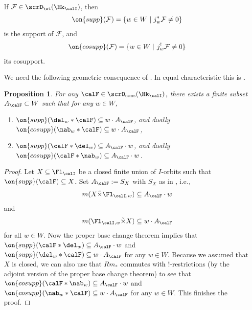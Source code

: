 \documentclass[10pt, reqno]{amsart}
\theoremstyle{plain}
\newtheorem{proposition}[theorem]{Proposition}
\theoremstyle{definition}
\numberwithin{equation}{section}
\begin{document}
	If $\mathcal{F}\in \scrD_\et(\Hk_{\calI})$, then
	\begin{equation}
		\on{supp}(\mathcal{F})=\{w\in W\ |\ j^\ast_w\mathcal{F}\neq 0\}
	\end{equation}
	is the support of $\mathcal{F}$, and
	\begin{equation}
		\on{cosupp}(\mathcal{F})=\{w\in W\ |\ j^!_w\mathcal{F}\neq 0\}
	\end{equation}
	its cosupport.
	
	We need the following geometric consequence of  . In equal characteristic this is \cite[Proposition 4.4.4.]{AR}.
	
	\begin{proposition} \label{prop_support_conv_standard}
		For any $\calF\in \scrD_{\mathrm{cons}}(\Hk_\calI)$, there exists a finite subset $A_\calF\subset W$ such that for any $w\in W$,
		\begin{enumerate}
			\item $ \on{supp}(\del_w*\calF) \subseteq w\cdot A_{\calF}$, and dually $\on{cosupp}(\nab_w*\calF)\subseteq w\cdot A_{\calF}$,
			\item $ \on{supp}(\calF*\del_w)\subseteq A_{\calF}\cdot w$, and dually $\on{cosupp}(\calF\ast \nab_w)\subseteq A_\calF\cdot w$.
		\end{enumerate}
	\end{proposition}
	\begin{proof}
		Let $X\subseteq \Fl_{\calI}$ be a closed finite union of $I$-orbits such that $\on{supp}(\calF)\subseteq X$. Set $A_\calF:=S_X$ with $S_X$ as in , i.e.,
		\begin{equation}
			m(X\tilde{\times} \Fl_{\calI, w})\subseteq A_\calF\cdot w
		\end{equation}
		and
		\begin{equation}
			m(\Fl_{\calI, w}\tilde{\times} X)\subseteq w\cdot A_\calF
		\end{equation}
		for all $w\in W$. Now the proper base change theorem implies that $\on{supp}(\calF\ast \del_w)\subseteq A_\calF\cdot w$ and $\on{supp}(\del_w\ast \calF)\subseteq w\cdot A_\calF$ for any $w\in W$. Because we assumed that $X$ is closed, we can also use that $Rm_\ast$ commutes with $!$-restrictions (by the adjoint version of the proper base change theorem) to see that $\on{cosupp}(\calF\ast \nab_w)\subseteq A_\calF\cdot w$ and $\on{cosupp}(\nab_w\ast \calF)\subseteq w\cdot A_\calF$ for any $w\in W$. This finishes the proof.
	\end{proof}
	
\end{document}
